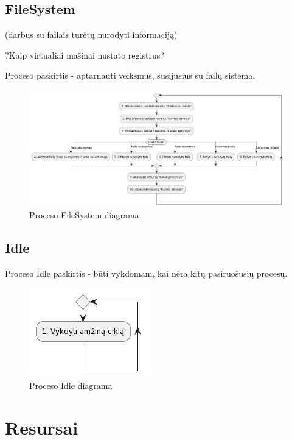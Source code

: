 \documentclass{VUMIFInfKursinis}
\begin{document}
\subsection{FileSystem}

(darbus su failais turėtų nurodyti informaciją)

?Kaip virtualiai mašinai nustato registrus?

Proceso paskirtis - aptarnauti veiksmus, susijusius su failų sistema.

\begin{figure}[H]
	\centering	
	\includegraphics[scale=0.35]{img/FileSystem}
	\caption{Proceso FileSystem diagrama}   %
	\label{img:FileSystem}
\end{figure}

\subsection{Idle}

Proceso Idle paskirtis - būti vykdomam, kai nėra kitų pasiruošusių procesų.

\begin{figure}[H]
	\centering	
	\includegraphics[scale=0.65]{img/Idle}
	\caption{Proceso Idle diagrama}   %
	\label{img:Idle}
\end{figure}


\section{Resursai}
\end{document}
